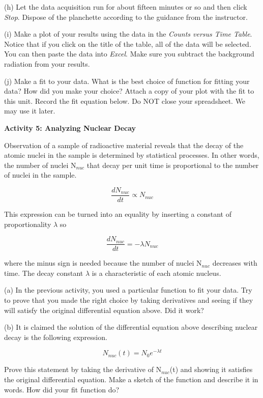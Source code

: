 (h) Let the data acquisition run for about fifteen minutes or so and then click \textit{Stop}.
Dispose of the planchette according to the guidance from the instructor.

(i) Make a plot of your results using the data in the {\it Counts versus Time Table}. 
Notice that if you 
click on the title of the table, all of the
data will be selected. You can then paste the data into {\it Excel}.
Make sure you subtract the background radiation from your results.

(j) Make a fit to your data. What is the best choice of function for fitting 
your data? How did you make your choice?
Attach a copy of your plot with the fit to this unit.
Record the fit equation below.
Do NOT close your spreadsheet. We may use it later.

\vspace{0.5in}

\textbf{Activity 5: Analyzing Nuclear Decay }

Observation of a sample of radioactive material reveals that the decay
of the atomic nuclei in the sample is determined by statistical processes.
In other words, the number of nuclei N\( _{nuc} \) that decay per
unit time is proportional to the number of nuclei in the sample.

\[
\frac{dN_{nuc}}{dt}\propto N_{nuc}\]


This expression can be turned into an equality by inserting a constant
of proportionality \( \lambda  \) so

\[
\frac{dN_{nuc}}{dt}=-\lambda N_{nuc}\]


where the minus sign is needed because the number of nuclei N\( _{nuc} \)
decreases with time. The decay constant \( \lambda  \) is a characteristic
of each atomic nucleus. 

(a) In the previous activity, you used a particular function to fit 
your data.
Try to prove that you made the right choice by taking derivatives and
seeing if they will satisfy the original differential equation above.
Did it work?
\answerspace{30mm}

\pagebreak[2]
(b) It is claimed the solution of the differential equation above
describing nuclear decay is the following expression.

\[
N_{nuc}(t)=N_{0}e^{-\lambda t}\]


Prove this statement by taking the derivative of N\( _{nuc} \)(t)
and showing it satisfies the original differential equation. Make
a sketch of the function and describe it in words.
How did your fit function do?
\answerspace{40mm}

